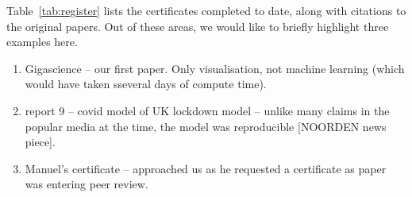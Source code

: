 \documentclass[12pt]{article}
\begin{document}
Table~\ref{tab:register} lists the certificates completed to date,
along with citations to the original papers.
Out of these areas, we would like to briefly highlight three examples here.

\begin{enumerate}
\def\labelenumi{\arabic{enumi}.}
\item
  Gigascience -- our first paper. Only visualisation, not machine
  learning (which would have taken sseveral days of compute time).
\item
  report 9 -- covid model of UK lockdown model -- unlike many claims
  in the popular media at the time, the model was reproducible
  [NOORDEN news piece]. 
\item
  Manuel's certificate -- approached us as he requested a certificate
  as paper was entering peer review.
\end{enumerate}
\end{document}
